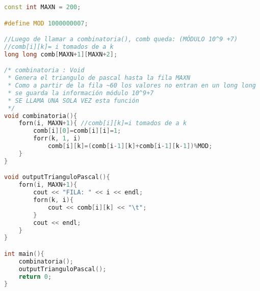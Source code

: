 \begin{lstlisting}[language=C++]
const int MAXN = 200;

#define MOD 1000000007;

//Luego de llamar a combinatoria(), comb queda: (MÓDULO 10^9 +7)
//comb[i][k]= i tomados de a k
long long comb[MAXN+1][MAXN+2];

/* combinatoria : Void
 * Genera el triangulo de pascal hasta la fila MAXN
 * Como a partir de la fila ~60 los valores no entran en un long long
 * se guarda la información módulo 10^9+7
 * SE LLAMA UNA SOLA VEZ esta función
 */
void combinatoria(){
	forn(i, MAXN+1){ //comb[i][k]=i tomados de a k
		comb[i][0]=comb[i][i]=1;
		forr(k, 1, i) 
			comb[i][k]=(comb[i-1][k]+comb[i-1][k-1])%MOD;
	}
}

void outputTrianguloPascal(){
	forn(i, MAXN+1){
		cout << "FILA: " << i << endl;
		forn(k, i){
			cout << comb[i][k] << "\t";
		}
		cout << endl;
	}
}

int main(){
	combinatoria();
	outputTrianguloPascal();
	return 0;
}
\end{lstlisting}


